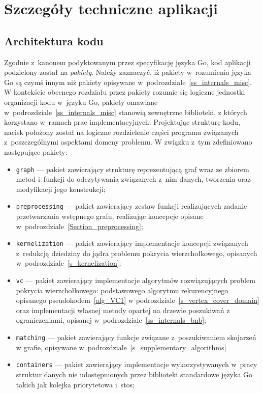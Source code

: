 \section{Szczegóły techniczne aplikacji}\label{s_internals_implementation}
\subsection{Architektura kodu}\label{ss_internals_architecture}
\par{
  Zgodnie z~kanonem podyktowanym przez specyfikację języka Go, kod aplikacji podzielony został na \emph{pakiety}.
  Należy zaznaczyć, iż pakiety w~rozumienia języka Go są czymś innym niż pakiety opisywane w~podrozdziale~\ref{ss_internals_misc}.
  W kontekście obecnego rozdziału przez pakiety rozumie się logiczne jednostki organizacji kodu w~języku Go, pakiety omawiane w~podrozdziale~\ref{ss_internals_misc} stanowią zewnętrzne biblioteki, z których korzystano w~ramach prac implementacyjnych.
  Projektując strukturę kodu, nacisk położony został na logiczne rozdzielenie części programu związanych z~poszczególnymi aspektami domeny problemu.
  W związku z~tym zdefiniowano następujące pakiety:
  \begin{itemize}
    \item \texttt{graph} --- pakiet zawierający strukturę reprezentującą graf wraz ze zbiorem metod i~funkcji do odczytywania związanych z~nim danych, tworzenia oraz modyfikacji jego konstrukcji;
    \item \texttt{preprocessing} --- pakiet zawierający zestaw funkcji realizujących zadanie przetwarzania wstępnego grafu, realizując koncepcje opisane w~podrozdziale~\ref{Section_preprocessing};
    \item \texttt{kernelization} --- pakiet zawierający implementacje koncepcji związanych z~redukcją dziedziny do jądra problemu pokrycia wierzchołkowego, opisanych w~podrozdziale~\ref{s_kernelization};
    \item \texttt{vc} --- pakiet zawierający implementacje algorytmów rozwiązujących problem pokrycia wierzchołkowego: podstawowego algorytmu rekurencyjnego opisanego pseudokodem~\ref{alg_VC1} w podrozdziale~\ref{s_vertex_cover_domain} oraz implementacji własnej metody opartej na drzewie poszukiwań z ograniczeniami, opisanej w~podrozdziale~\ref{ss_internals_bnb};
    \item \texttt{matching} --- pakiet zawierający funkcje związane z~poszukiwaniem skojarzeń w grafie, opisywane w~podrozdziale~\ref{s_supplementary_algorithms}
    \item \texttt{containers} --- pakiet zawierający implementacje wykorzystywanych w~pracy struktur danych nie udostępnionych przez biblioteki standardowe języka Go takich jak kolejka priorytetowa i~stos;

\end{itemize}}
